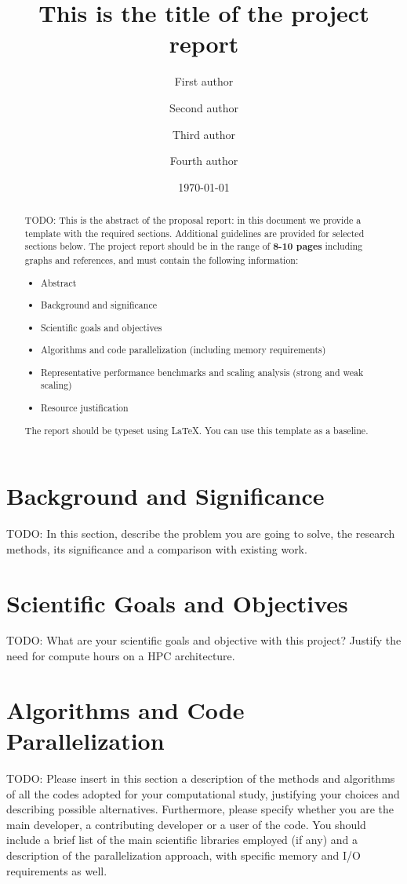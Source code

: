 \documentclass[11pt]{article}
\title{This is the title of the project report}
\author[1]{First author}
\author[2]{Second author}
\author[1,2]{Third author}
\author[1,2]{Fourth author}
\affil[1]{Affiliation of first author}
\affil[2]{Other affiliation}
\date{\today}
\begin{document}
\maketitle

\begin{abstract}
  TODO: This is the abstract of the proposal report: in this document we
  provide a template with the required sections.  Additional guidelines are
  provided for selected sections below. The project report should be in the
  range of \textbf{8-10 pages} including graphs and references, and must
  contain the following information:
  \begin{itemize}
    \item Abstract
    \item Background and significance
    \item Scientific goals and objectives
    \item Algorithms and code parallelization (including memory requirements)
    \item Representative performance benchmarks and scaling analysis
      (strong and weak scaling)
    \item Resource justification
  \end{itemize}
  The report should be typeset using \LaTeX{}\cite{lamport1993a}.  You can use
  this template as a baseline.
\end{abstract}

\section{Background and Significance}

  TODO: In this section, describe the problem you are going to solve, the
  research methods, its significance and a comparison with existing work.


\section{Scientific Goals and Objectives}

  TODO: What are your scientific goals and objective with this project?
  Justify the need for compute hours on a HPC architecture.


\section{Algorithms and Code Parallelization}

  TODO: Please insert in this section a description of the methods and
  algorithms of all the codes adopted for your computational study, justifying
  your choices and describing possible alternatives. Furthermore, please
  specify whether you are the main developer, a contributing developer or a
  user of the code. You should include a brief list of the main scientific
  libraries employed (if any) and a description of the parallelization
  approach, with specific memory and I/O requirements as well.
\end{document}
